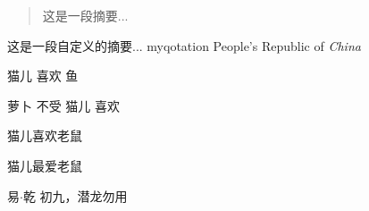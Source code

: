 \documentclass{ctexart}%
\newcommand{\PRC}{People's Republic of \emph{China}}
\newcommand{\loves}[2]{#1 喜欢 #2}
\newcommand{\hateby}[2]{#2 不受 #1 喜欢}
\newcommand{\love}[3][喜欢]{#2#1#3}
\newenvironment{myabstract}[1][摘要]
\newenvironment{myqotation}[1]%
{\newcommand\quotesource{#1}%
	\begin{quotation}}%
		{\par\hfill---《\textit{\quotesource}》\end{quotation}}
\begin{document}
	\begin{abstract}
		这是一段摘要...
	\end{abstract}

	\begin{myabstract}[我的摘要]
	    这是一段自定义的摘要...
    \end{myabstract}	
    \PRC
    
    \loves{猫儿}{鱼}
    
    \hateby{猫儿}{萝卜}
    
    \love{猫儿}{老鼠}
    
    \love[最爱]{猫儿}{老鼠}
    
    \begin{myqotation}{易$\cdot$乾}  
    	初九，潜龙勿用
    \end{myqotation}  	
\end{document}
